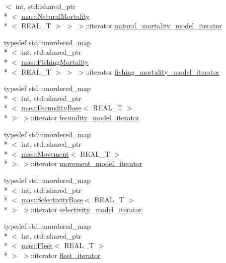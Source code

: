 \begin{DoxyCompactItemize}
$<$ int, std\-::shared\-\_\-ptr\\*
$<$ \hyperlink{structmas_1_1_natural_mortality}{mas\-::\-Natural\-Mortality}\\*
$<$ R\-E\-A\-L\-\_\-\-T $>$ $>$ $>$\-::iterator \hyperlink{classmas_1_1_information_a146940168f5079ca711b74f29ea7d6bc}{natural\-\_\-mortality\-\_\-model\-\_\-iterator}
\item 
typedef std\-::unordered\-\_\-map\\*
$<$ int, std\-::shared\-\_\-ptr\\*
$<$ \hyperlink{structmas_1_1_fishing_mortality}{mas\-::\-Fishing\-Mortality}\\*
$<$ R\-E\-A\-L\-\_\-\-T $>$ $>$ $>$\-::iterator \hyperlink{classmas_1_1_information_a4410f0f10156666ee305f22698943955}{fishing\-\_\-mortality\-\_\-model\-\_\-iterator}
\item 
typedef std\-::unordered\-\_\-map\\*
$<$ int, std\-::shared\-\_\-ptr\\*
$<$ \hyperlink{structmas_1_1_fecundity_base}{mas\-::\-Fecundity\-Base}$<$ R\-E\-A\-L\-\_\-\-T $>$\\*
 $>$ $>$\-::iterator \hyperlink{classmas_1_1_information_a1d4b59c5d61de9efed4709ce6e0a056a}{fecundity\-\_\-model\-\_\-iterator}
\item 
typedef std\-::unordered\-\_\-map\\*
$<$ int, std\-::shared\-\_\-ptr\\*
$<$ \hyperlink{structmas_1_1_movement}{mas\-::\-Movement}$<$ R\-E\-A\-L\-\_\-\-T $>$\\*
 $>$ $>$\-::iterator \hyperlink{classmas_1_1_information_aa69e662c74a82f02c72a94684c289490}{movement\-\_\-model\-\_\-iterator}
\item 
typedef std\-::unordered\-\_\-map\\*
$<$ int, std\-::shared\-\_\-ptr\\*
$<$ \hyperlink{structmas_1_1_selectivity_base}{mas\-::\-Selectivity\-Base}$<$ R\-E\-A\-L\-\_\-\-T $>$\\*
 $>$ $>$\-::iterator \hyperlink{classmas_1_1_information_a0760e4946119a28f018ff73cbdd0171f}{selectivity\-\_\-model\-\_\-iterator}
\item 
typedef std\-::unordered\-\_\-map\\*
$<$ int, std\-::shared\-\_\-ptr\\*
$<$ \hyperlink{structmas_1_1_fleet}{mas\-::\-Fleet}$<$ R\-E\-A\-L\-\_\-\-T $>$\\*
 $>$ $>$\-::iterator \hyperlink{classmas_1_1_information_a35add34ab4432f87d932531b06444ff7}{fleet\-\_\-iterator}

\end{DoxyCompactItemize}
